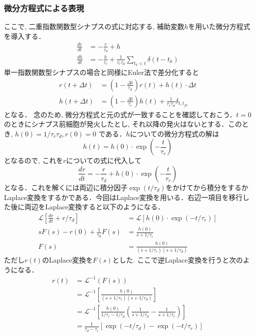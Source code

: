 \subsubsection{微分方程式による表現}ここで, 二重指数関数型シナプスの式に対応する, 補助変数$h$を用いた微分方程式を導入する． 
$$
\begin{align} 
\frac{dr}{dt}&=-\frac{r}{\tau_{d}}+h\\
\frac{dh}{dt}&=-\frac{h}{\tau_{r}}+\frac{1}{\tau_{r} \tau_{d}} \sum_{t_{k}< t} \delta\left(t-t_{k}\right) 
\end{align} 
$$
単一指数関数型シナプスの場合と同様にEuler法で差分化すると 
$$
\begin{align} 
r(t+\Delta t)&=\left(1-\frac{\Delta t}{\tau_{d}}\right)r(t)+h(t)\cdot \Delta t\\ 
h(t+\Delta t)&=\left(1-\frac{\Delta t}{\tau_{r}}\right)h(t)+\frac{1}{\tau_{r}\tau_{d}} \delta_{t,t_{j k}}
\end{align}
$$
となる．
念のため, 微分方程式と元の式が一致することを確認しておこう．$t=0$のときにシナプス前細胞が発火したとし, それ以降の発火はないとする．このとき, $h(0)=1/\tau_{r}\tau_{d}, r(0)=0$ である．$h$についての微分方程式の解は
$$
\begin{equation}
h(t)=h(0)\cdot \exp\left(-\frac{t}{\tau_r}\right)    
\end{equation}
$$
となるので, これを$r$についての式に代入して
$$
\begin{equation}
\frac{dr}{dt}=-\frac{r}{\tau_{d}}+h(0)\cdot \exp\left(-\frac{t}{\tau_r}\right) 
\end{equation}
$$
となる．これを解くには両辺に積分因子$\exp({t}/{\tau_d})$をかけてから積分をするかLaplace変換をするかである．今回はLaplace変換を用いる．右辺一項目を移行した後に両辺をLaplace変換すると以下のようになる．
$$
\begin{align}
\mathcal{L}\left[\frac{dr}{dt}+r/\tau_{d}\right]&=\mathcal{L}\left[h(0)\cdot \exp\left(-t/\tau_r\right)\right]\\
sF(s)-r(0)+\frac{1}{\tau_{d}}F(s)&=\frac{h(0)}{s+1/\tau_r}\\
F(s)&=\frac{h(0)}{(s+1/\tau_r)(s+1/\tau_d)}
\end{align}
$$
ただし$r(t)$のLaplace変換を$F(s)$とした. ここで逆Laplace変換を行うと次のようになる．
$$
\begin{align}
r(t)&=\mathcal{L}^{-1}(F(s))\\
&=\mathcal{L}^{-1}\left[\frac{h(0)}{(s+1/\tau_r)(s+1/\tau_d)}\right]\\
&=\mathcal{L}^{-1}\left[\frac{h(0)}{1/\tau_r-1/\tau_d}\left(\frac{1}{s+1/\tau_d}-\frac{1}{s+1/\tau_r}\right)\right]\\
&=\frac{1}{\tau_d-\tau_r}\left[\exp(-t/\tau_d)-\exp(-t/\tau_r)\right]
\end{align}
$$
